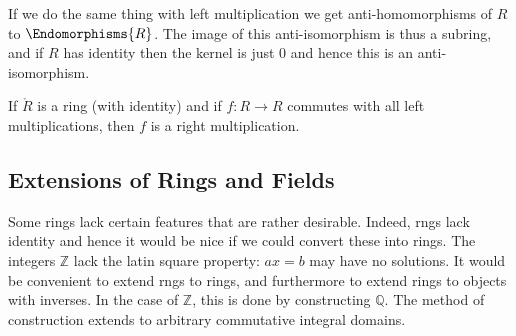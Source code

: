 \documentclass{article}                                                        %
\begin{document}
                If we do the same thing with left multiplication we get
                anti-homomorphisms of $R$ to $\Endomorphisms{R}$. The image of
                this anti-isomorphism is thus a subring, and if $R$ has identity
                then the kernel is just $0$ and hence this is an
                anti-isomorphism.
                \begin{theorem}
                    If $\ring{R}$ is a ring (with identity) and if
                    $f:R\rightarrow{R}$ commutes with all left multiplications,
                    then $f$ is a right multiplication.
                \end{theorem}
        \subsection{Extensions of Rings and Fields}
            Some rings lack certain features that are rather desirable. Indeed,
            rngs lack identity and hence it would be nice if we could convert
            these into rings. The integers $\mathbb{Z}$ lack the latin square
            property: $ax=b$ may have no solutions. It would be convenient to
            extend rngs to rings, and furthermore to extend rings to objects
            with inverses. In the case of $\mathbb{Z}$, this is done by
            constructing $\mathbb{Q}$. The method of construction extends to
            arbitrary commutative integral domains.
\end{document}
